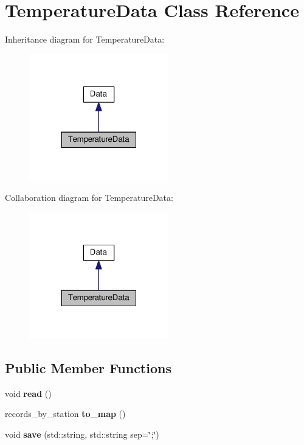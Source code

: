 \hypertarget{classTemperatureData}{}\section{Temperature\+Data Class Reference}
\label{classTemperatureData}


Inheritance diagram for Temperature\+Data\+:\nopagebreak
\begin{figure}[H]
\begin{center}
\leavevmode
\includegraphics[width=172pt]{classTemperatureData__inherit__graph}
\end{center}
\end{figure}


Collaboration diagram for Temperature\+Data\+:\nopagebreak
\begin{figure}[H]
\begin{center}
\leavevmode
\includegraphics[width=172pt]{classTemperatureData__coll__graph}
\end{center}
\end{figure}
\subsection*{Public Member Functions}
\begin{DoxyCompactItemize}
\item 
void {\bfseries read} ()\hypertarget{classTemperatureData_ac481b4de9ca185ac241f991d954c5794}{}\label{classTemperatureData_ac481b4de9ca185ac241f991d954c5794}

\item 
records\+\_\+by\+\_\+station {\bfseries to\+\_\+map} ()\hypertarget{classTemperatureData_af86f3b796d2b55220792e4b722a07026}{}\label{classTemperatureData_af86f3b796d2b55220792e4b722a07026}

\item 
void {\bfseries save} (std\+::string, std\+::string sep=\char`\"{};\char`\"{})\hypertarget{classTemperatureData_abec9bfba8d8e0a32a240c051d44bc7e2}{}\label{classTemperatureData_abec9bfba8d8e0a32a240c051d44bc7e2}

\end{DoxyCompactItemize}
